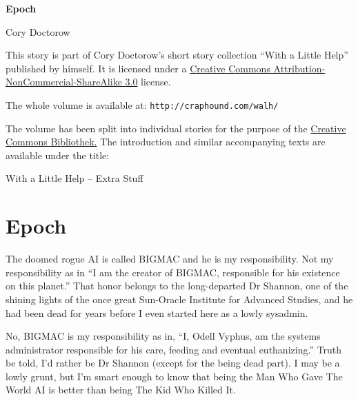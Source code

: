 


\raggedbottom

\begin{center}
\textbf{\huge\textsf{Epoch}}

\medskip
Cory Doctorow

\end{center}

\bigskip

\begin{flushleft}
This story is part of Cory Doctorow’s short story collection
“With a Little Help” published by himself. It is licensed under a
\href{http://creativecommons.org/licenses/by-nc-sa/}
{Creative Commons Attribution-NonCommercial-ShareAlike 3.0} license.

\bigskip

The whole volume is available at:
\texttt{http://craphound.com/walh/}

\medskip

The volume has been split into individual stories for the purpose of the
\href{http://ccbib.org}{Creative Commons Bibliothek.}
The introduction and similar accompanying texts are available under the 
title:
\end{flushleft}
\begin{center}
With a Little Help -- Extra Stuff
\end{center}

\newpage

\section{Epoch}

The doomed rogue AI is called BIGMAC and he is my responsibility. Not 
my responsibility as in “I am the creator of BIGMAC, responsible for 
his existence on this planet.” That honor belongs to the 
long-departed Dr Shannon, one of the shining lights of the once great 
Sun-Oracle Institute for Advanced Studies, and he had been dead for 
years before I even started here as a lowly sysadmin.

No, BIGMAC is my responsibility as in, “I, Odell Vyphus, am the 
systems administrator responsible for his care, feeding and eventual 
euthanizing.” Truth be told, I'd rather be Dr Shannon (except for the 
being dead part). I may be a lowly grunt, but I'm smart enough to know 
that being the Man Who Gave The World AI is better than being The Kid 
Who Killed It.


